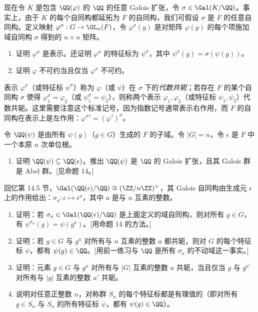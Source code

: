 现在令 $K$ 是包含 $\QQ(\varphi)$ 的 $\QQ$ 的任意 Galois 扩张，令 $\sigma\in\Gal(K/\QQ)$。事实上，由于 $K$ 的每个自同构都延拓为 $F$ 的自同构，我们可假设 $\sigma$ 是 $F$ 的任意自同构。定义映射 $\varphi^\sigma:G\to\GL_n(F)$，令 $\varphi^\sigma(g)$ 是对矩阵 $\varphi(g)$ 的每个项施加域自同构 $\sigma$ 得到的 $n\times n$ 矩阵。
\begin{enumerate}[label=\arabic*.,resume]
  \item 证明 $\varphi^\sigma$ 是表示。还证明 $\varphi^\sigma$ 的特征标为 $\psi^\sigma$，其中 $\psi^\sigma(g)=\sigma(\psi(g))$。
  \item 证明 $\varphi$ 不可约当且仅当 $\varphi^\sigma$ 不可约。
\end{enumerate}
表示 $\varphi^\sigma$（或特征标 $\psi^\sigma$）称为 $\varphi$（或 $\psi$）在 $\sigma$ 下的\emph{代数共轭}；若存在 $F$ 的某个自同构 $\sigma$ 使得 $\varphi_1^\sigma=\varphi_2$（或 $\psi_1^\sigma=\psi_2$），则称两个表示 $\varphi_1,
\varphi_2$（或特征标 $\psi_1,
\psi_2$）代数共轭。这里需要注意这个标准记号，因为指数记号通常表示右作用，而 $F$ 的自同构在表示上是左作用：$\varphi^{\sigma\tau}=(\varphi^\tau)^\sigma$。

令 $\QQ(\psi)$ 是由所有 $\psi(g)$（$g\in G$）生成的 $F$ 的子域。令 $|G|=n$，令 $\epsilon$ 是 $F$ 中一个本原 $n$ 次单位根。
\begin{enumerate}[label=\arabic*.,resume]
  \item 证明 $\QQ(\psi)\subseteq\QQ(\epsilon)$。推出 $\QQ(\psi)$ 是 $\QQ$ 的 Galois 扩张，且其 Galois 群是 Abel 群。[见命题 14。]
\end{enumerate}

回忆第 14.5 节，$\Gal(\QQ(\epsilon)/\QQ)\cong(\ZZ/n\ZZ)^\times$，其 Galois 自同构由生成元 $\epsilon$ 上的作用给出：$\sigma_a:\epsilon\mapsto\epsilon^a$，其中 $a$ 是与 $n$ 互素的整数。
\begin{enumerate}[label=\arabic*.,resume]
  \item 证明：若 $\sigma_a\in\Gal(\QQ(\epsilon)/\QQ)$ 是上面定义的域自同构，则对所有 $g\in G$，有 $\psi^{\sigma_a}(g)=\psi(g^a)$。[用命题 14 的方法。]
  \item 证明：若 $g\in G$ 与 $g^a$ 对所有与 $n$ 互素的整数 $a$ 都共轭，则对 $G$ 的每个特征标 $\psi$，都有 $\psi(g)\in\QQ$。[用前一练习与 $\QQ$ 是所有 $\sigma_a$ 的不动域这一事实。]
  \item 证明：元素 $g\in G$ 与 $g^a$ 对所有与 $|G|$ 互素的整数 $a$ 共轭，当且仅当 $g$ 与 $g^{a'}$ 对所有与 $|g|$ 互素的整数 $a'$ 共轭。
  \item 说明对任意正整数 $n$，对称群 $S_n$ 的每个特征标都是有理值的（即对所有 $g\in S_n$ 与 $S_n$ 的所有特征标 $\psi$，都有 $\psi(g)\in\QQ$）。
\end{enumerate}

